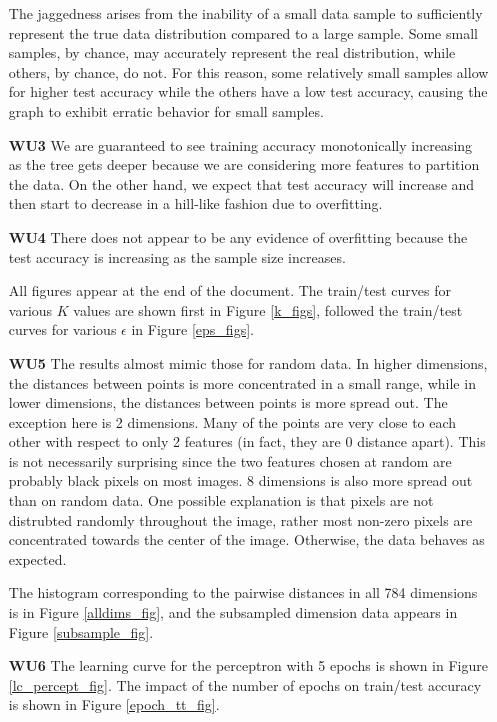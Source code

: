 \documentclass{article}
\begin{document}
\begin{enumerate}
		The jaggedness arises from the inability of a small data sample to sufficiently represent
		the true data distribution compared to a large sample. Some small samples, by chance, may
		accurately represent the real distribution, while others, by chance, do not. For this
		reason, some relatively small samples allow for higher test accuracy while the others
		have a low test accuracy, causing the graph to exhibit erratic behavior for small samples.
	
	\item[\textbf{WU3}] We are guaranteed to see training accuracy monotonically increasing as
		the tree gets deeper because we are considering more features to partition the data. On
		the other hand, we expect that test accuracy will increase and then start to decrease in
		a hill-like fashion due to overfitting. 
	
	\item[\textbf{WU4}] There does not appear to be any evidence of overfitting because the test
		accuracy is increasing as the sample size increases.
		
		All figures appear at the end of the document. The train/test curves for various $K$
		values are shown first in Figure \ref{k_figs}, followed the train/test curves for various
		$\epsilon$ in Figure \ref{eps_figs}.
		
	\item[\textbf{WU5}] The results almost mimic those for random data. In higher dimensions, the
		distances between points is more concentrated in a small range, while in lower dimensions,
		the distances between points is more spread out. The exception here is 2 dimensions. Many
		of the points are very close to each other with respect to only 2 features (in fact, they
		are 0 distance apart). This is not necessarily surprising since the two features chosen
		at random are probably black pixels on most images. 8 dimensions is also more spread out
		than on random data. One possible explanation is that pixels are not distrubted randomly
		throughout the image, rather most non-zero pixels are concentrated towards the center
		of the image. Otherwise, the data behaves as expected.
		
		The histogram corresponding to the pairwise distances in all 784 dimensions is in Figure
		\ref{alldims_fig}, and the subsampled dimension data appears in Figure 
		\ref{subsample_fig}.
		
	\item[\textbf{WU6}] The learning curve for the perceptron with 5 epochs is shown in Figure
		 \ref{lc_percept_fig}. The impact of the number of epochs on train/test accuracy is shown
		 in Figure \ref{epoch_tt_fig}.
	
	\end{enumerate}
	
\end{document}
